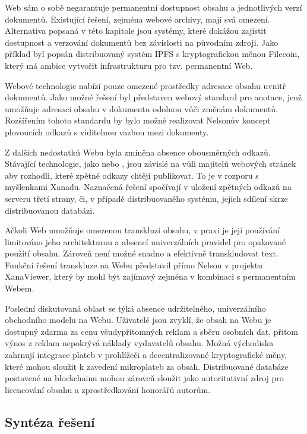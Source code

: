 Web sám o sobě negarantuje permanentní dostupnost obsahu a jednotlivých verzí dokumentů. Existující řešení, zejména webové archivy, mají svá omezení. Alternativa popsaná v této kapitole jsou  systémy, které dokážou zajistit dostupnost a verzování dokumentů bez závislosti na původním zdroji.
Jako příklad byl popsán distribuovaný systém IPFS s kryptografickou měnou Filecoin, který má ambice vytvořit infrastrukturu pro tzv. permanentní Web.

Webové technologie nabízí pouze omezené prostředky adresace obsahu uvnitř dokumentů. Jako možné řešení byl představen webový standard pro anotace, jenž umožňuje adresaci obsahu v dokumentu odolnou vůči změnám dokumentů. Rozšířením tohoto standardu by bylo možné realizovat Nelsonův koncept plovoucích odkazů s viditelnou vazbou mezi dokumenty.

Z dalších nedostatků Webu byla zmíněna absence obousměrných odkazů. Stávající technologie, jako  nebo , jsou závislé na vůli majitelů webových stránek aby rozhodli, které zpětné odkazy chtějí publikovat. To je v rozporu s myšlenkami Xanadu. Naznačená řešení spočívají v uložení zpětných odkazů na serveru třetí strany, či, v případě distribuovaného systému, jejich sdílení skrze distribuovanou databázi.

Ačkoli Web umožňuje omezenou transkluzi obsahu, v praxi je její používání limitováno jeho architekturou a absencí univerzálních pravidel pro opakované použití obsahu. Zároveň není možné snadno a efektivně transkludovat text. Funkční řešení transkluze na Webu představil přímo Nelson v projektu XanaViewer, který by mohl být zajímavý zejména v kombinaci s permanentním Webem.

Poslední diskutovaná oblast se týká absence udržitelného, univerzálního obchodního modelu na Webu. Uživatelé jsou zvyklí, že obsah na Webu je dostupný zdarma za cenu všudypřítomných reklam a sběru osobních dat, přitom výnos z reklam nepokrývá náklady vydavatelů obsahu.
Možná východiska zahrnují integrace plateb v prohlížeči a decentralizované kryptografické měny, které mohou sloužit k zavedení mikroplateb za obsah.
Distribuované databáze postavené na blockchainu mohou zároveň sloužit jako autoritativní zdroj pro licencování obsahu a zprostředkování honorářů autorům.

\subsection{Syntéza řešení}

